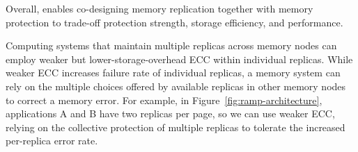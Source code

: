 Overall, \ramp enables co-designing memory replication together with memory protection to trade-off protection strength, storage efficiency, and performance.
Computing systems that maintain multiple replicas across memory nodes can employ weaker but lower-storage-overhead ECC within individual replicas. 
While weaker ECC increases failure rate of individual replicas, a memory system can rely on the multiple choices offered by available replicas in other memory nodes to correct a memory error. 
For example, in Figure~\ref{fig:ramp-architecture}, applications A and B have two replicas per page, so we can use weaker ECC, relying on the collective protection of multiple replicas to tolerate the increased per-replica error rate.



